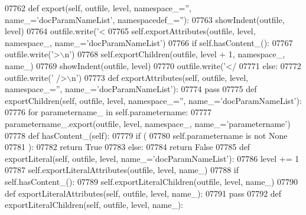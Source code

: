 \begin{DoxyCode}
{{{{{{{{{{{{{{{{{{{{{{{{{{{{{{{{{{{{{{{{{{{{{{{{{{{{{{{{{{{{{{{{{{{{{{{{{{{{{{{{{{{{{{{{{{{{{{{{{{{{{{{{{{{{{{{{{{{{{{{{{{{{{{{{{{{{{{{{{{{{{{{{{{{{{{{{{{{{{{{{{{{{{{{{{{{{{{{{{{{{{{{{{{{{{{{{{{{{{{{{{{{{{{{{{{{{{{{{{{{{{{{{{{{{{{{{{{{{{{{{{{{{{{{{{{{{{{{{{{{{{{{{{{{{{{{{{{{{{{{{{{{{{{{{{{{{{{{{{{{{{{{{{{{{{{{{{{{{{{{{{{{{{{{{{{{{{{{{{{{{{{{{{{{{{{{{{{{{{{{{{{{{{{{{{{{{{{{{{{{{{{{{{{{{{{{{{{{{{{{{{{{{{{{{{{{{{{{{{{{{{{{{{{{{{{{{{{{{{{{{{{{{{{{{{{{{{{{{{{{{{{{{{{{{{{{{{{{{{{{{07762     \textcolor{keyword}{def }export(self, outfile, level, namespace\_='', name\_='docParamNameList', namespacedef\_=''):
07763         showIndent(outfile, level)
07764         outfile.write(\textcolor{stringliteral}{'<%
07765         self.exportAttributes(outfile, level, namespace\_, name\_=\textcolor{stringliteral}{'docParamNameList'})
07766         \textcolor{keywordflow}{if} self.hasContent_():
07767             outfile.write(\textcolor{stringliteral}{'>\(\backslash\)n'})
07768             self.exportChildren(outfile, level + 1, namespace\_, name\_)
07769             showIndent(outfile, level)
07770             outfile.write(\textcolor{stringliteral}{'</%
07771         \textcolor{keywordflow}{else}:
07772             outfile.write(\textcolor{stringliteral}{' />\(\backslash\)n'})
07773     \textcolor{keyword}{def }exportAttributes(self, outfile, level, namespace\_='', name\_='docParamNameList'):
07774         \textcolor{keywordflow}{pass}
07775     \textcolor{keyword}{def }exportChildren(self, outfile, level, namespace\_='', name\_='docParamNameList'):
07776         \textcolor{keywordflow}{for} parametername\_ \textcolor{keywordflow}{in} self.parametername:
07777             parametername\_.export(outfile, level, namespace\_, name\_=\textcolor{stringliteral}{'parametername'})
07778     \textcolor{keyword}{def }hasContent_(self):
07779         \textcolor{keywordflow}{if} (
07780             self.parametername \textcolor{keywordflow}{is} \textcolor{keywordflow}{not} \textcolor{keywordtype}{None}
07781             ):
07782             \textcolor{keywordflow}{return} \textcolor{keyword}{True}
07783         \textcolor{keywordflow}{else}:
07784             \textcolor{keywordflow}{return} \textcolor{keyword}{False}
07785     \textcolor{keyword}{def }exportLiteral(self, outfile, level, name\_='docParamNameList'):
07786         level += 1
07787         self.exportLiteralAttributes(outfile, level, name\_)
07788         \textcolor{keywordflow}{if} self.hasContent_():
07789             self.exportLiteralChildren(outfile, level, name\_)
07790     \textcolor{keyword}{def }exportLiteralAttributes(self, outfile, level, name\_):
07791         \textcolor{keywordflow}{pass}
07792     \textcolor{keyword}{def }exportLiteralChildren(self, outfile, level, name\_):
}}}}}}}}}}}}}}}}}}}}}}}}}}}}}}}}}}}}}}}}}}}}}}}}}}}}}}}}}}}}}}}}}}}}}}}}}}}}}}}}}}}}}}}}}}}}}}}}}}}}}}}}}}}}}}}}}}}}}}}}}}}}}}}}}}}}}}}}}}}}}}}}}}}}}}}}}}}}}}}}}}}}}}}}}}}}}}}}}}}}}}}}}}}}}}}}}}}}}}}}}}}}}}}}}}}}}}}}}}}}}}}}}}}}}}}}}}}}}}}}}}}}}}}}}}}}}}}}}}}}}}}}}}}}}}}}}}}}}}}}}}}}}}}}}}}}}}}}}}}}}}}}}}}}}}}}}}}}}}}}}}}}}}}}}}}}}}}}}}}}}}}}}}}}}}}}}}}}}}}}}}}}}}}}}}}}}}}}}}}}}}}}}}}}}}}}}}}}}}}}}}}}}}}}}}}}}}}}}}}}}}}}}}}}}}}}}}}}}}}}}}}}}}}}}}}}}}}}}}}}}}}}}}}}}}}}}}}}}}}}}}
\end{DoxyCode}
